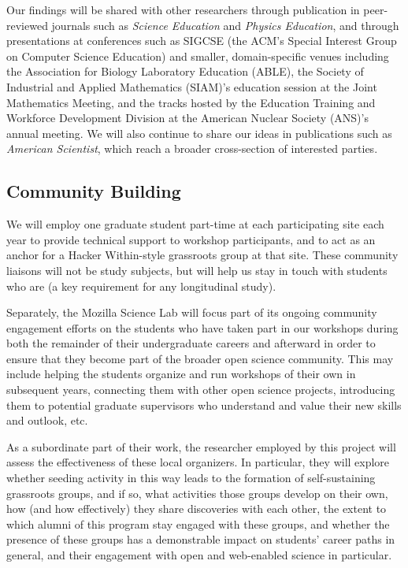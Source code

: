 \documentclass[11pt]{article}
\begin{document}
Our findings will be shared with other researchers through publication
in peer-reviewed journals such as \emph{Science Education} and
\emph{Physics Education}, and through presentations at conferences
such as SIGCSE (the ACM's Special Interest Group on Computer Science
Education) and smaller, domain-specific venues including the
Association for Biology Laboratory Education (ABLE), the Society of
Industrial and Applied Mathematics (SIAM)'s education session at the
Joint Mathematics Meeting, and the tracks hosted by the Education
Training and Workforce Development Division at the American Nuclear
Society (ANS)'s annual meeting.  We will also continue to share our
ideas in publications such as \emph{American Scientist}, which reach a
broader cross-section of interested parties.

\subsection{Community Building}

We will employ one graduate student part-time at each participating
site each year to provide technical support to workshop participants,
and to act as an anchor for a Hacker Within-style grassroots group at
that site.  These community liaisons will not be study subjects, but
will help us stay in touch with students who are (a key requirement
for any longitudinal study).

Separately, the Mozilla Science Lab will focus part of its ongoing
community engagement efforts on the students who have taken part in
our workshops during both the remainder of their undergraduate careers
and afterward in order to ensure that they become part of the broader
open science community.  This may include helping the students
organize and run workshops of their own in subsequent years,
connecting them with other open science projects, introducing them to
potential graduate supervisors who understand and value their new
skills and outlook, etc.

As a subordinate part of their work, the researcher employed by this
project will assess the effectiveness of these local organizers.  In
particular, they will explore whether seeding activity in this way
leads to the formation of self-sustaining grassroots groups, and if
so, what activities those groups develop on their own, how (and how
effectively) they share discoveries with each other, the extent to
which alumni of this program stay engaged with these groups, and
whether the presence of these groups has a demonstrable impact on
students' career paths in general, and their engagement with open and
web-enabled science in particular.
\end{document}
